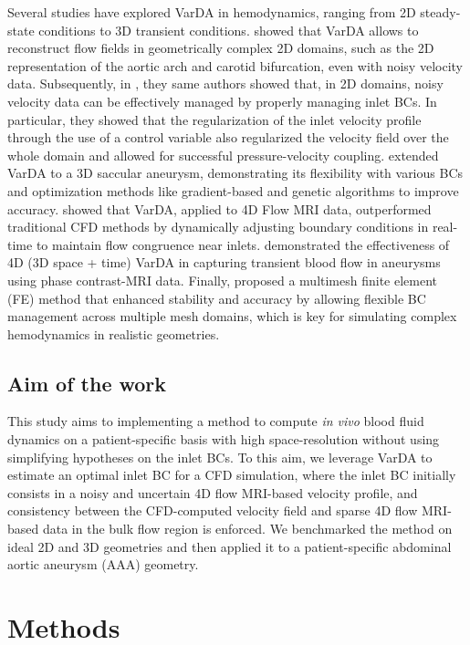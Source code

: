 Several studies have explored VarDA in hemodynamics, ranging from 2D steady-state conditions to 3D transient conditions.
\cite{Delia2012} showed that 
VarDA allows to reconstruct flow fields in geometrically complex 2D domains, such as the 2D representation of the aortic arch and carotid bifurcation, even with noisy velocity data. Subsequently, in \cite{Delia2013}, they same authors showed that, in 2D domains, noisy velocity data can be effectively managed by properly managing inlet BCs. In particular, they showed that the regularization of the inlet velocity profile through the use of a control variable also regularized the velocity field over the whole domain and allowed for successful pressure-velocity coupling.
\cite{Tiago2017} extended VarDA to a 3D saccular aneurysm, demonstrating its flexibility with various BCs and optimization methods like gradient-based and genetic algorithms to improve accuracy. \cite{Koltukluoglu2018} showed that VarDA, applied to 4D Flow MRI data, outperformed traditional CFD methods by dynamically adjusting boundary conditions in real-time to maintain flow congruence near inlets. \cite{Funke2019} demonstrated the effectiveness of 4D (3D space + time) VarDA in capturing transient blood flow in aneurysms using phase contrast-MRI data. Finally, \cite{Dokken2020} proposed a multimesh finite element (FE) method that enhanced stability and accuracy by allowing flexible BC management across multiple mesh domains, which is key for simulating complex hemodynamics in realistic geometries.

\subsection*{Aim of the work}
This study aims to implementing a method to compute \textit{in vivo} blood fluid dynamics on a patient-specific basis with high space-resolution without using simplifying hypotheses on the inlet BCs. To this aim, we leverage VarDA to estimate an optimal inlet BC for a CFD simulation, where the inlet BC initially consists in a noisy and uncertain 4D flow MRI-based velocity profile, and consistency between the CFD-computed velocity field and sparse 4D flow MRI-based data in the bulk flow region is enforced. 
We benchmarked the method on ideal 2D and 3D geometries and then applied it to a patient-specific abdominal aortic aneurysm (AAA) geometry. 

\section*{Methods}
\label{sec:methods}

